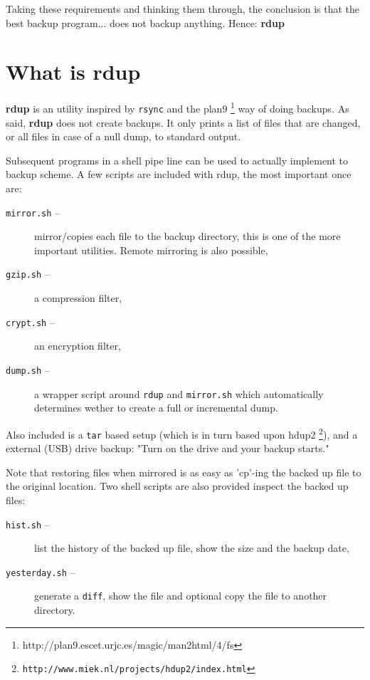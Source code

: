 \documentclass{article}
\newcommand{\rdup}{\textbf{rdup}}
\newcommand{\cmd}[1]{\texttt{#1}}
\newcommand{\url}[1]{\texttt{#1}}
\begin{document}
Taking these requirements and thinking them through, the
conclusion is that the best backup program... does not backup anything.
Hence: \rdup

\section*{What is \rdup}
\rdup{} is an utility inspired by \cmd{rsync} and the 
plan9 \footnote{http://plan9.escet.urjc.es/magic/man2html/4/fs} 
way of doing backups. As said, \rdup{} does not create backups. It only
prints a list of files that are changed, or all files in case of a null
dump, to standard output.

Subsequent programs in a shell pipe line can be used to actually
implement to backup scheme. A few scripts are included with rdup, 
the most important once are:
\begin{description}
        \item[\cmd{mirror.sh} --]{
                mirror/copies each file to the backup directory, this is
                one of the more important utilities. Remote mirroring
                is also possible,}
        \item[\cmd{gzip.sh} --]{
                a compression filter,}
        \item[\cmd{crypt.sh} --]{
                an encryption filter,}
        \item[\cmd{dump.sh} --]{
                a wrapper script around \cmd{rdup} and \cmd{mirror.sh}
                which automatically determines wether to create a full
                or incremental dump.}
\end{description}

Also included is
a \cmd{tar} based setup (which is in turn based upon
hdup2 \footnote{\url{http://www.miek.nl/projects/hdup2/index.html}}), 
and a external (USB) drive backup: "Turn on the drive and your backup
starts."

Note that restoring files when mirrored is as easy as 'cp'-ing the
backed up file to the original location. Two shell scripts are
also provided inspect the backed up files:
\begin{description}
        \item[\cmd{hist.sh} --]{
                list the history of the backed up file, show the size
                and the backup date,}
        \item[\cmd{yesterday.sh} --]{
                generate a \cmd{diff}, show the file and optional copy 
                the file to another directory.}
\end{description}
\end{document}
